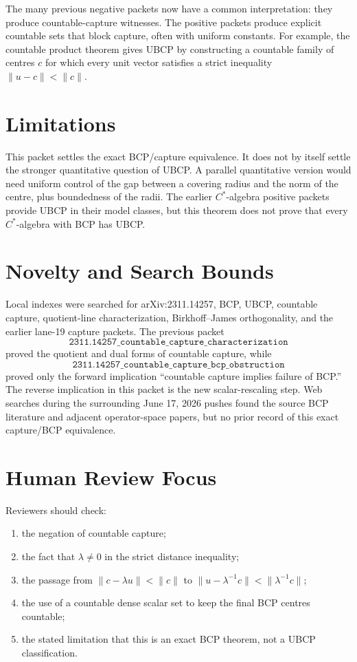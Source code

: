 \documentclass[11pt]{article}
\begin{document}
The many previous negative packets now have a common interpretation: they
produce countable-capture witnesses.  The positive packets produce explicit
countable sets that block capture, often with uniform constants.  For example,
the countable product theorem gives UBCP by constructing a countable family
of centres \(c\) for which every unit vector satisfies a strict inequality
\(\|u-c\|<\|c\|\).

\section*{Limitations}

This packet settles the exact BCP/capture equivalence.  It does not by itself
settle the stronger quantitative question of UBCP.  A parallel quantitative
version would need uniform control of the gap between a covering radius and
the norm of the centre, plus boundedness of the radii.  The earlier
\(C^*\)-algebra positive packets provide UBCP in their model classes, but this
theorem does not prove that every \(C^*\)-algebra with BCP has UBCP.

\section*{Novelty and Search Bounds}

Local indexes were searched for arXiv:2311.14257, BCP, UBCP, countable
capture, quotient-line characterization, Birkhoff--James orthogonality, and
the earlier lane-19 capture packets.  The previous packet
\[
\texttt{2311.14257\_countable\_capture\_characterization}
\]
proved the quotient and dual forms of countable capture, while
\[
\texttt{2311.14257\_countable\_capture\_bcp\_obstruction}
\]
proved only the forward implication ``countable capture implies failure of
BCP.''  The reverse implication in this packet is the new scalar-rescaling
step.  Web searches during the surrounding June 17, 2026 pushes found the
source BCP literature and adjacent operator-space papers, but no prior record
of this exact capture/BCP equivalence.

\section*{Human Review Focus}

Reviewers should check:
\begin{enumerate}
    \item the negation of countable capture;
    \item the fact that \(\lambda\ne0\) in the strict distance inequality;
    \item the passage from \(\|c-\lambda u\|<\|c\|\) to
          \(\|u-\lambda^{-1}c\|<\|\lambda^{-1}c\|\);
    \item the use of a countable dense scalar set to keep the final BCP
          centres countable;
    \item the stated limitation that this is an exact BCP theorem, not a
          UBCP classification.
\end{enumerate}
\end{document}
